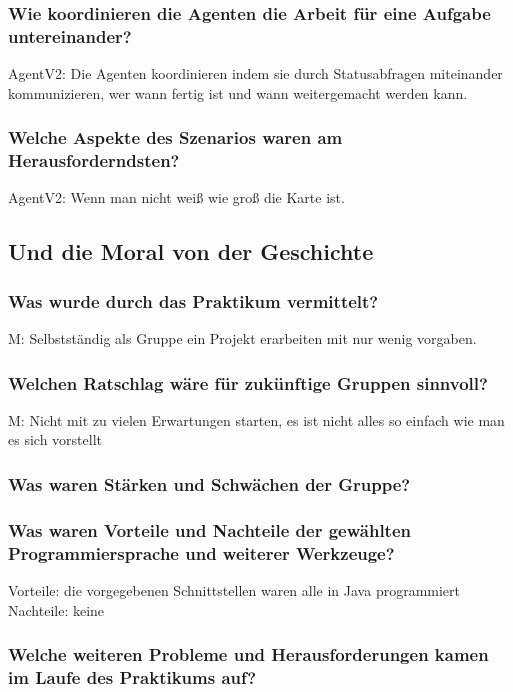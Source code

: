 \documentclass[runningheads]{llncs}
\begin{document}
\subsubsection{Wie koordinieren die Agenten die Arbeit für eine Aufgabe untereinander?\\}
AgentV2: Die Agenten koordinieren indem sie durch Statusabfragen miteinander kommunizieren, wer wann fertig ist und wann weitergemacht werden kann. 
\subsubsection{Welche Aspekte des Szenarios waren am Herausforderndsten?\\}
AgentV2: Wenn man nicht weiß wie groß die Karte ist.
\subsection{Und die Moral von der Geschichte}
\subsubsection{Was wurde durch das Praktikum vermittelt?\\}
M: Selbstständig als Gruppe ein Projekt erarbeiten mit nur wenig vorgaben.
\subsubsection{Welchen Ratschlag wäre für zukünftige Gruppen sinnvoll?\\}
M: Nicht mit zu vielen Erwartungen starten, es ist nicht alles so einfach wie man es sich vorstellt
\subsubsection{Was waren Stärken und Schwächen der Gruppe?\\}
\subsubsection{Was waren Vorteile und Nachteile der gewählten Programmiersprache und weiterer Werkzeuge?\\}
Vorteile: die vorgegebenen Schnittstellen waren alle in Java programmiert\\
Nachteile: keine
\subsubsection{Welche weiteren Probleme und Herausforderungen kamen im Laufe des Praktikums auf?\\}
\end{document}
